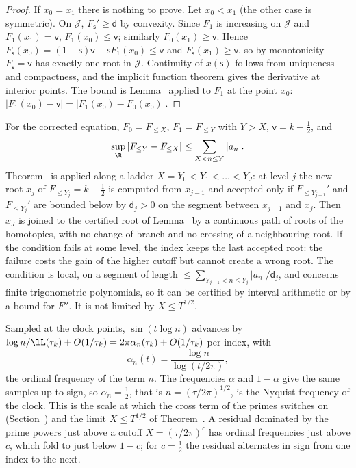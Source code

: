 \begin{proof}
If $x_0=x_1$ there is nothing to prove. Let $x_0<x_1$ (the other case is symmetric). On $\mathscr J$, $F_{\mathsf s}'\ge\mathsf d$ by convexity. Since $F_1$ is increasing on $\mathscr J$ and $F_1(x_1)=\mathsf v$, $F_1(x_0)\le\mathsf v$; similarly $F_0(x_1)\ge\mathsf v$. Hence $F_{\mathsf s}(x_0)=(1-\mathsf s)\mathsf v+\mathsf sF_1(x_0)\le\mathsf v$ and $F_{\mathsf s}(x_1)\ge\mathsf v$, so by monotonicity $F_{\mathsf s}=\mathsf v$ has exactly one root in $\mathscr J$. Continuity of $x(\mathsf s)$ follows from uniqueness and compactness, and the implicit function theorem gives the derivative at interior points. The bound is Lemma~ applied to $F_1$ at the point $x_0$: $|F_1(x_0)-\mathsf v|=|F_1(x_0)-F_0(x_0)|$.
\end{proof}

For the corrected equation, $F_0=F_{\le X}$, $F_1=F_{\le Y}$ with $Y>X$, $\mathsf v=k-\frac12$, and
\begin{equation}
\sup_{\R}|F_{\le Y}-F_{\le X}|\le\sum_{X<n\le Y}|a_n|.
\label{eq:continuation_step}
\end{equation}
Theorem~ is applied along a ladder $X=Y_0<Y_1<\dots<Y_J$: at level $j$ the new root $x_j$ of $F_{\le Y_j}=k-\frac12$ is computed from $x_{j-1}$ and accepted only if $F_{\le Y_{j-1}}'$ and $F_{\le Y_j}'$ are bounded below by $\mathsf d_j>0$ on the segment between $x_{j-1}$ and $x_j$. Then $x_J$ is joined to the certified root of Lemma~ by a continuous path of roots of the homotopies, with no change of branch and no crossing of a neighbouring root. If the condition fails at some level, the index keeps the last accepted root: the failure costs the gain of the higher cutoff but cannot create a wrong root. The condition is local, on a segment of length $\le\sum_{Y_{j-1}<n\le Y_j}|a_n|/\mathsf d_j$, and concerns finite trigonometric polynomials, so it can be certified by interval arithmetic or by a bound for $F''$. It is not limited by $X\le T^{1/2}$.

\begin{remark}\label{rem:nyquist}
Sampled at the clock points, $\sin(t\log n)$ advances by $\log n/\lL(\tau_k)+O(1/\tau_k)=2\pi\alpha_n(\tau_k)+O(1/\tau_k)$ per index, with
\begin{equation}
\alpha_n(t)=\frac{\log n}{\log(t/2\pi)},
\label{eq:ordinal_frequency}
\end{equation}
the ordinal frequency of the term $n$. The frequencies $\alpha$ and $1-\alpha$ give the same samples up to sign, so $\alpha_n=\frac12$, that is $n=(\tau/2\pi)^{1/2}$, is the Nyquist frequency of the clock. This is the scale at which the cross term of the primes switches on (Section~) and the limit $X\le T^{1/2}$ of Theorem~. A residual dominated by the prime powers just above a cutoff $X=(\tau/2\pi)^{c}$ has ordinal frequencies just above $c$, which fold to just below $1-c$; for $c=\frac12$ the residual alternates in sign from one index to the next.
\end{remark}

